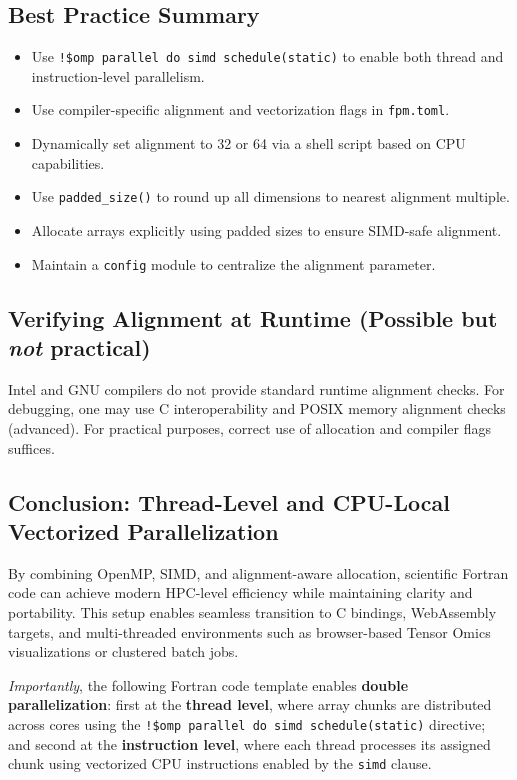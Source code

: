 \documentclass{article}
\begin{document}
\subsection{Best Practice Summary}

\begin{itemize}
\item Use \texttt{!\$omp parallel do simd schedule(static)} to enable both thread and instruction-level parallelism.
\item Use compiler-specific alignment and vectorization flags in \texttt{fpm.toml}.
\item Dynamically set alignment to 32 or 64 via a shell script based on CPU capabilities.
\item Use \texttt{padded\_size()} to round up all dimensions to nearest alignment multiple.
\item Allocate arrays explicitly using padded sizes to ensure SIMD-safe alignment.
\item Maintain a \texttt{config} module to centralize the alignment parameter.
\end{itemize}

\subsection{Verifying Alignment at Runtime (Possible but \emph{not} practical)}

Intel and GNU compilers do not provide standard runtime alignment checks. For
debugging, one may use C interoperability and POSIX memory alignment checks
(advanced). For practical purposes, correct use of allocation and compiler
flags suffices.

\subsection{Conclusion: Thread-Level and CPU-Local Vectorized Parallelization}

By combining OpenMP, SIMD, and alignment-aware allocation, scientific Fortran code can achieve modern HPC-level efficiency while maintaining clarity and portability. This setup enables seamless transition to C bindings, WebAssembly targets, and multi-threaded environments such as browser-based Tensor Omics visualizations or clustered batch jobs.

\emph{Importantly}, the following Fortran code template enables \textbf{double parallelization}: first at the \textbf{thread level}, where array chunks are distributed across cores using the \texttt{!\$omp parallel do simd schedule(static)} directive; and second at the \textbf{instruction level}, where each thread processes its assigned chunk using vectorized CPU instructions enabled by the \texttt{simd} clause.
\end{document}
